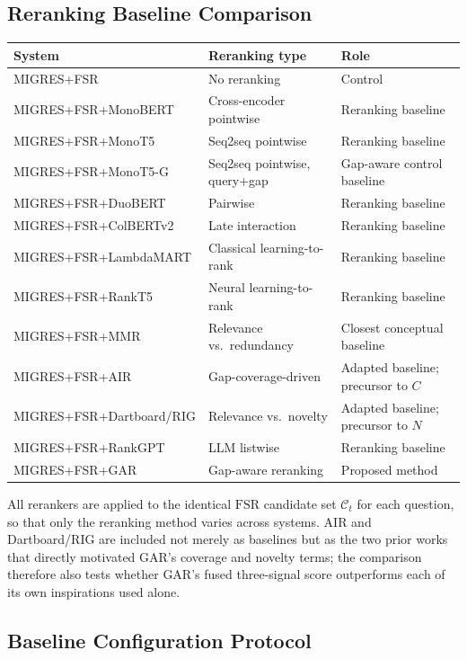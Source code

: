\documentclass[11pt,a4paper]{article}
\begin{document}
\subsection{Reranking Baseline Comparison}

\begin{center}
\begin{tabular}{lll}
\toprule
\textbf{System} & \textbf{Reranking type} & \textbf{Role}\\
\midrule
MIGRES+FSR & No reranking & Control\\
MIGRES+FSR+MonoBERT & Cross-encoder pointwise & Reranking baseline\\
MIGRES+FSR+MonoT5 & Seq2seq pointwise & Reranking baseline\\
MIGRES+FSR+MonoT5-G & Seq2seq pointwise, query+gap & Gap-aware control baseline\\
MIGRES+FSR+DuoBERT & Pairwise & Reranking baseline\\
MIGRES+FSR+ColBERTv2 & Late interaction & Reranking baseline\\
MIGRES+FSR+LambdaMART & Classical learning-to-rank & Reranking baseline\\
MIGRES+FSR+RankT5 & Neural learning-to-rank & Reranking baseline\\
MIGRES+FSR+MMR & Relevance vs.\ redundancy & Closest conceptual baseline\\
MIGRES+FSR+AIR & Gap-coverage-driven & Adapted baseline; precursor to $C$\\
MIGRES+FSR+Dartboard/RIG & Relevance vs.\ novelty & Adapted baseline; precursor to $N$\\
MIGRES+FSR+RankGPT & LLM listwise & Reranking baseline\\
MIGRES+FSR+GAR & Gap-aware reranking & Proposed method\\
\bottomrule
\end{tabular}
\end{center}

All rerankers are applied to the identical $\mathrm{FSR}$ candidate set $\mathcal{C}_t$ for each question, so that only the reranking method varies across systems. AIR and Dartboard/RIG are included not merely as baselines but as the two prior works that directly motivated GAR's coverage and novelty terms; the comparison therefore also tests whether GAR's fused three-signal score outperforms each of its own inspirations used alone.

\subsection{Baseline Configuration Protocol}
\label{sec:baseline-protocol}
\end{document}
